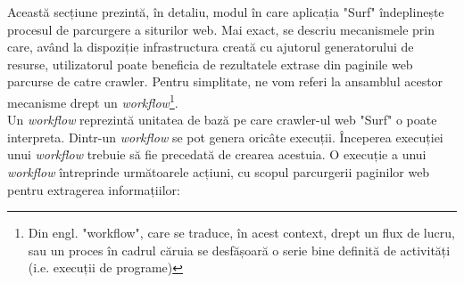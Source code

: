 Această secțiune prezintă, în detaliu, modul în care aplicația "Surf" îndeplinește procesul de parcurgere a siturilor web. Mai exact, se descriu mecanismele prin care, având la dispoziție infrastructura creată cu ajutorul generatorului de resurse, utilizatorul poate beneficia de rezultatele extrase din paginile web parcurse de catre crawler. Pentru simplitate, ne vom referi la ansamblul acestor mecanisme drept un \textit{workflow}\footnote{Din engl. "workflow", care se traduce, în acest context, drept un flux de lucru, sau un proces în cadrul căruia se desfășoară o serie bine definită de activități (i.e. execuții de programe)}.
\\

\noindent
Un \textit{workflow} reprezintă unitatea de bază pe care crawler-ul web "Surf" o poate interpreta. Dintr-un \textit{workflow} se pot genera oricâte execuții. Începerea execuției unui \textit{workflow} trebuie să fie precedată de crearea acestuia. O execuție a unui \textit{workflow} întreprinde următoarele acțiuni, cu scopul parcurgerii paginilor web pentru extragerea informațiilor:

